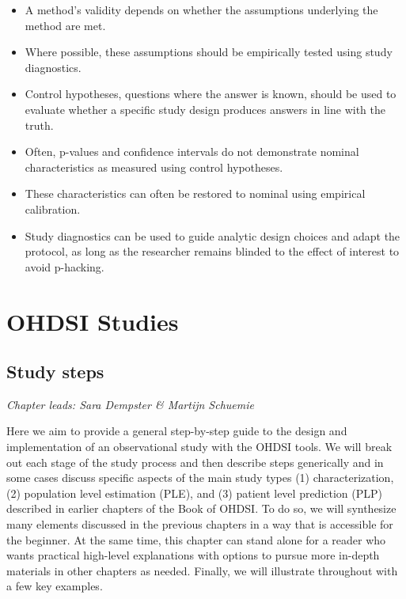 \documentclass[11pt]{book}
\theoremstyle{definition}
\theoremstyle{definition}
\theoremstyle{definition}
\theoremstyle{remark}
\let\BeginKnitrBlock\begin \let\EndKnitrBlock\end
\begin{document}
\BeginKnitrBlock{rmdsummary}
\begin{itemize}
\item
  A method's validity depends on whether the assumptions underlying the
  method are met.
\item
  Where possible, these assumptions should be empirically tested using
  study diagnostics.
\item
  Control hypotheses, questions where the answer is known, should be
  used to evaluate whether a specific study design produces answers in
  line with the truth.
\item
  Often, p-values and confidence intervals do not demonstrate nominal
  characteristics as measured using control hypotheses.
\item
  These characteristics can often be restored to nominal using empirical
  calibration.
\item
  Study diagnostics can be used to guide analytic design choices and
  adapt the protocol, as long as the researcher remains blinded to the
  effect of interest to avoid p-hacking.
\end{itemize}
\EndKnitrBlock{rmdsummary}

\part{OHDSI Studies}\label{part-ohdsi-studies}

\chapter{Study steps}\label{StudySteps}

\emph{Chapter leads: Sara Dempster \& Martijn Schuemie}

Here we aim to provide a general step-by-step guide to the design and
implementation of an observational study with the OHDSI tools. We will
break out each stage of the study process and then describe steps
generically and in some cases discuss specific aspects of the main study
types (1) characterization, (2) population level estimation (PLE), and
(3) patient level prediction (PLP) described in earlier chapters of the
Book of OHDSI. To do so, we will synthesize many elements discussed in
the previous chapters in a way that is accessible for the beginner. At
the same time, this chapter can stand alone for a reader who wants
practical high-level explanations with options to pursue more in-depth
materials in other chapters as needed. Finally, we will illustrate
throughout with a few key examples.
\end{document}
